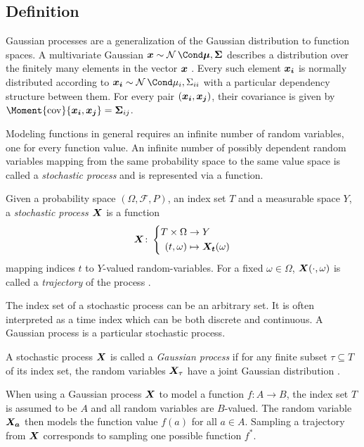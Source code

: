 \subsection{Definition}
Gaussian processes are a generalization of the Gaussian distribution to function spaces.
A multivariate Gaussian $\mat{x} \sim \Gaussian{\mat{\mu}, \mat{\Sigma}}$ describes a distribution over the finitely many elements in the vector $\bm{x}$ \cite{gauss_theoria_1809}.
Every such element $\bm{x_i}$ is normally distributed according to $\rv{x_i} \sim \Gaussian{\mu_i, \Sigma_{ii}}$ with a particular dependency structure between them.
For every pair $(\bm{x_i}, \bm{x_j})$, their covariance is given by $\Moment{\cov}{\rv{x_i}, \rv{x_j}} = \mat{\Sigma}_{ij}$.

Modeling functions in general requires an infinite number of random variables, one for every function value.
An infinite number of possibly dependent random variables mapping from the same probability space to the same value space is called a \emph{stochastic process} and is represented via a function.

\begin{definition}
    \label{def:stochastic_process}
    Given a probability space $(\Omega, \mathcal{F}, P)$, an index set $T$ and a measurable space $Y$, a \emph{stochastic process $\bm{X}$} is a function
    \begin{align}
        \bm{X} \colon \left\{\begin{aligned}
            T \times \Omega &\to Y \\
            (t, \omega) &\mapsto \bm{X_t}(\omega)
        \end{aligned}\right.
    \end{align}
    mapping indices $t$ to $Y$-valued random-variables.
    For a fixed $\omega \in \Omega$, $\bm{X}(\cdot, \omega)$ is called a \emph{trajectory} of the process \cite{astrom_introduction_1971}.
\end{definition}

The index set of a stochastic process can be an arbitrary set.
It is often interpreted as a time index which can be both discrete and continuous.
A Gaussian process is a particular stochastic process.
\begin{definition}
    \label{def:gaussian_process}
    A stochastic process $\bm{X}$ is called a \emph{Gaussian process} if for any finite subset $\tau \subseteq T$ of its index set, the random variables $\bm{X}_\tau$ have a joint Gaussian distribution \cite{astrom_introduction_1971}.
\end{definition}
When using a Gaussian process $\bm{X}$ to model a function $f \colon A \to B$, the index set $T$ is assumed to be $A$ and all random variables are $B$-valued.
The random variable $\bm{X_a}$ then models the function value $f(a)$ for all $a \in A$.
Sampling a trajectory from $\bm{X}$ corresponds to sampling one possible function $f^\ast$.

